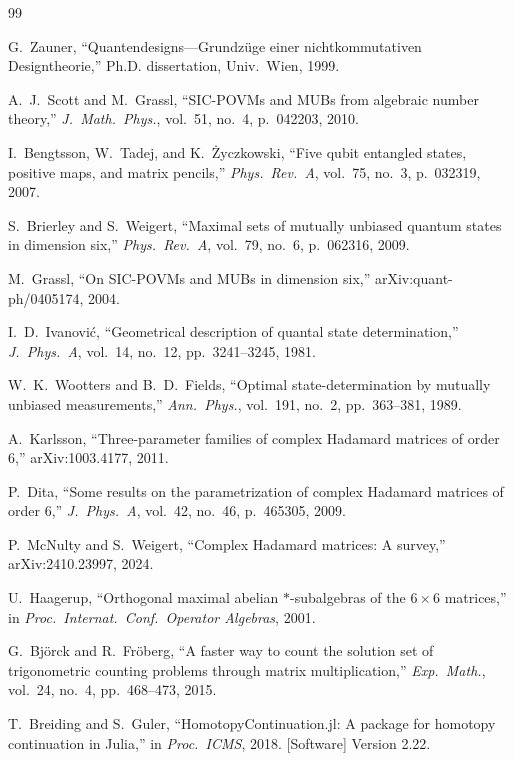 \documentclass[onecolumn]{IEEEtran}
\begin{document}
\begin{thebibliography}{99}

G.~Zauner, ``Quantendesigns---Grundz\"uge einer nichtkommutativen Designtheorie,'' Ph.D. dissertation, Univ.\ Wien, 1999.

A.~J.~Scott and M.~Grassl, ``SIC-POVMs and MUBs from algebraic number theory,'' \emph{J.\ Math.\ Phys.}, vol.~51, no.~4, p.~042203, 2010.

I.~Bengtsson, W.~Tadej, and K.~\.Zyczkowski, ``Five qubit entangled states, positive maps, and matrix pencils,'' \emph{Phys.\ Rev.\ A}, vol.~75, no.~3, p.~032319, 2007.

S.~Brierley and S.~Weigert, ``Maximal sets of mutually unbiased quantum states in dimension six,'' \emph{Phys.\ Rev.\ A}, vol.~79, no.~6, p.~062316, 2009.

M.~Grassl, ``On SIC-POVMs and MUBs in dimension six,'' arXiv:quant-ph/0405174, 2004.

I.~D.~Ivanovi\'c, ``Geometrical description of quantal state determination,'' \emph{J.\ Phys.\ A}, vol.~14, no.~12, pp.~3241--3245, 1981.

W.~K.~Wootters and B.~D.~Fields, ``Optimal state-determination by mutually unbiased measurements,'' \emph{Ann.\ Phys.}, vol.~191, no.~2, pp.~363--381, 1989.

A.~Karlsson, ``Three-parameter families of complex Hadamard matrices of order 6,'' arXiv:1003.4177, 2011.

P.~Dita, ``Some results on the parametrization of complex Hadamard matrices of order 6,'' \emph{J.\ Phys.\ A}, vol.~42, no.~46, p.~465305, 2009.

P.~McNulty and S.~Weigert, ``Complex Hadamard matrices: A survey,'' arXiv:2410.23997, 2024.

U.~Haagerup, ``Orthogonal maximal abelian $*$-subalgebras of the $6\times6$ matrices,'' in \emph{Proc.\ Internat.\ Conf.\ Operator Algebras}, 2001.

G.~Bj\"orck and R.~Fr\"oberg, ``A faster way to count the solution set of trigonometric counting problems through matrix multiplication,'' \emph{Exp.\ Math.}, vol.~24, no.~4, pp.~468--473, 2015.

T.~Breiding and S.~Guler, ``HomotopyContinuation.jl: A package for homotopy continuation in Julia,'' in \emph{Proc.\ ICMS}, 2018. [Software] Version 2.22.

\end{thebibliography}
\end{document}
